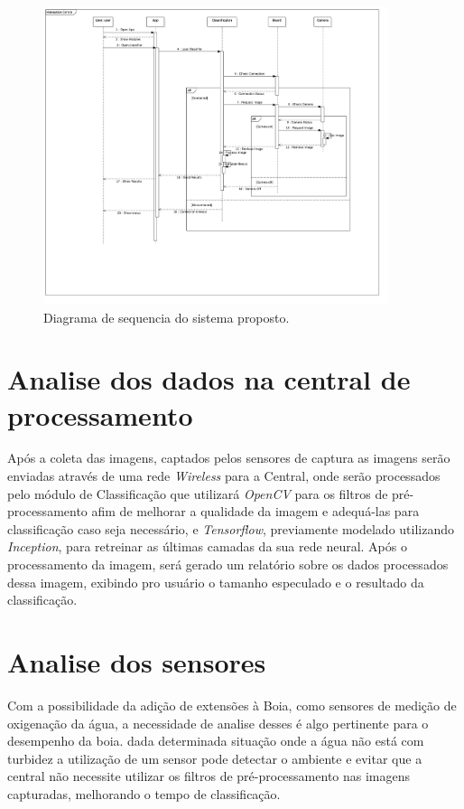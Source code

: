 \begin{figure}[ht]
	\caption{\label{fig:seqkraken}  Diagrama de sequencia do sistema proposto.}
	 \begin{center}
		\includegraphics[width = 0.9\textwidth]			{resources/sequencekraken}
    \end{center}
\end{figure}


\section{Analise dos dados na central de processamento}
Após a coleta das imagens, captados pelos sensores de captura as imagens serão enviadas através de uma rede \textit{Wireless} para a Central, onde serão processados pelo módulo de Classificação que utilizará \textit{OpenCV} para os filtros de pré-processamento afim de melhorar a qualidade da imagem e adequá-las para classificação caso seja necessário, e \textit{Tensorflow}, previamente modelado utilizando \textit{Inception}, para retreinar as últimas camadas da sua rede neural. 
Após o processamento da imagem, será gerado um relatório sobre os dados processados dessa imagem, exibindo pro usuário o tamanho especulado e o resultado da classificação.


\section{Analise dos sensores}
Com a possibilidade da adição de extensões à Boia, como sensores de medição de oxigenação da água, a necessidade de analise desses é algo pertinente para o desempenho da boia. dada determinada situação onde a água não está com turbidez a utilização de um sensor pode detectar o ambiente e evitar que a central não necessite utilizar os filtros de pré-processamento nas imagens capturadas, melhorando o tempo de classificação.



